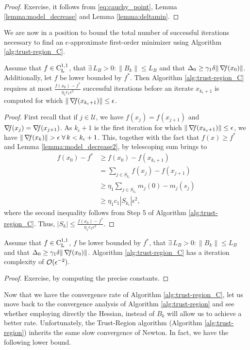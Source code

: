 \documentclass[10pt,a4paper]{article}
\begin{document}
\begin{proof}
	Exercise, it follows from \eqref{eq:cauchy_point}, Lemma \ref{lemma:model_decrease} and Lemma \ref{lemma:deltamin}.
\end{proof}

\noindent We are now in a position to bound the total number of successful iterations necessary to find an $\epsilon$-approximate first-order minimizer using Algorithm \ref{alg:trust-region_C}.

\begin{lemma} \label{lemma:tr_succ}
	Assume that $f\in \mathord{\mathrm{C^{1,1}_{L}}}$, that $\exists\, L_B>0: \|B_k\| \leq L_B$ and that $\Delta_0\geq \gamma_1 \delta \|\operatorname*{\mathit{\nabla \!f}}(x_0)\|$. Additionally, let $f$ be lower bounded by $f^*$. Then Algorithm \ref{alg:trust-region_C} requires at most $\frac{f(x_0) - f^*}{\eta_1c_1\epsilon^2}$ successful iterations before an iterate $x_{k_\epsilon+1}$ is computed for which $\|\operatorname*{\mathit{\nabla \!f}}(x_{k_\epsilon+1})\| \leq \epsilon$.
\end{lemma}
\begin{proof}
First recall that if $j\in \mathcal{U}$, we have $f(x_j) = f(x_{j+1})$ and $\operatorname*{\mathit{\nabla \!f}}(x_j)=\operatorname*{\mathit{\nabla \!f}}(x_{j+1})$. As $k_\epsilon+1$ is the first iteration for which $\|\operatorname*{\mathit{\nabla \!f}}(x_{k_\epsilon+1})\| \leq \epsilon$, we have $\|\grad(x_k)\|>\epsilon \; \forall \, k <k_\epsilon+1$. This, together with the fact that $f(x)\geq f^*$ and Lemma \ref{lemma:model_decrease2}, by telescoping sum brings to 
\begin{align*}
	f(x_0)-f^* &\geq f(x_0) - f(x_{k_\epsilon+1})\\
	& =\sum_{j\in S_{k_\epsilon}} f(x_j) - f(x_{j+1})\\
	& \geq \eta_1 \sum_{j\in S_{k_\epsilon}} m_j(0)- m_j(s_j)\\
	& \geq \eta_1 c_1 |S_{k_\epsilon}| \epsilon^2,
\end{align*}
where the second inequality follows from Step 5 of Algorithm \ref{alg:trust-region_C}. Thus, $|S_k|\leq  \frac{f(x_0) - f^*}{\eta_1c_1 \epsilon^2}.$
\end{proof}

\begin{theorem}
	Assume that $f\in \mathord{\mathrm{C^{1,1}_{L}}}$, $f$ be lower bounded by $f^*$, that $\exists\, L_B>0: \|B_k\| \leq L_B$ and that $\Delta_0\geq \gamma_1 \delta \|\operatorname*{\mathit{\nabla \!f}}(x_0)\|$. Algorithm \ref{alg:trust-region_C} has a iteration complexity of $\mathcal{O}(\epsilon^{-2})$.
\end{theorem}
\begin{proof}
	Exercise, by computing the precise constants.
\end{proof}
Now that we have the convergence rate of Algorithm \ref{alg:trust-region_C}, let us move back to the convergence analysis of Algorithm \ref{alg:trust-region} and see whether employing directly the Hessian, instead of $B_k$ will allow us to achieve a better rate. Unfortunately, the Trust-Region algorithm (Algorithm \ref{alg:trust-region}) inherits the same slow convergence of Newton. In fact, we have the following lower bound.
\end{document}
